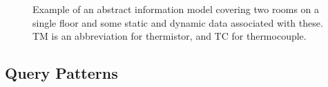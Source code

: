 \begin{figure}[tbp]
  \begin{center}
  \end{center}
  \caption[Example of an abstract information model]{Example of an abstract information model covering two rooms on a single floor and some static and dynamic data associated with these. TM is an abbreviation for thermistor, and TC for thermocouple.}
  \label{fig:topics:info:model}
\end{figure}

\subsection{Query Patterns}



